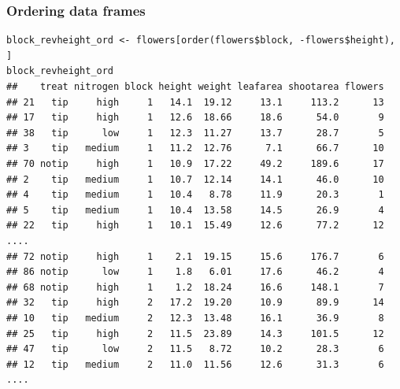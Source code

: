 \documentclass{beamer}
\newcommand{\lsting}[1]{\begin{lstlisting}[basicstyle=#1]}
\newcommand{\bfr}[1]{\begin{frame}[fragile]\frametitle{{ #1 }}}
\begin{document}
\bfr{Ordering data frames}
\lsting{\tiny}
block_revheight_ord <- flowers[order(flowers$block, -flowers$height), ]        
block_revheight_ord
##    treat nitrogen block height weight leafarea shootarea flowers
## 21   tip     high     1   14.1  19.12     13.1     113.2      13
## 17   tip     high     1   12.6  18.66     18.6      54.0       9
## 38   tip      low     1   12.3  11.27     13.7      28.7       5
## 3    tip   medium     1   11.2  12.76      7.1      66.7      10
## 70 notip     high     1   10.9  17.22     49.2     189.6      17
## 2    tip   medium     1   10.7  12.14     14.1      46.0      10
## 4    tip   medium     1   10.4   8.78     11.9      20.3       1
## 5    tip   medium     1   10.4  13.58     14.5      26.9       4
## 22   tip     high     1   10.1  15.49     12.6      77.2      12
....
## 72 notip     high     1    2.1  19.15     15.6     176.7       6
## 86 notip      low     1    1.8   6.01     17.6      46.2       4
## 68 notip     high     1    1.2  18.24     16.6     148.1       7
## 32   tip     high     2   17.2  19.20     10.9      89.9      14
## 10   tip   medium     2   12.3  13.48     16.1      36.9       8
## 25   tip     high     2   11.5  23.89     14.3     101.5      12
## 47   tip      low     2   11.5   8.72     10.2      28.3       6
## 12   tip   medium     2   11.0  11.56     12.6      31.3       6
....
\end{lstlisting}
\end{frame}
\end{document}
